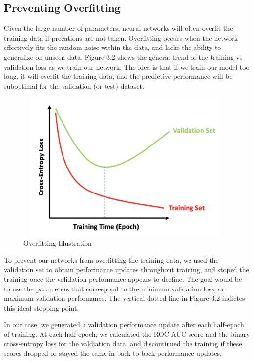 \documentclass [MAS] {uclathes}
\begin{document}
\subsection{Preventing Overfitting}

Given the large number of parameters, neural networks will often overfit the training data if precations are not taken. Overfitting occurs when the network effectively fits the random noise within the data, and lacks the ability to generalize on unseen data. Figure 3.2 shows the general trend of the training vs validation loss as we train our network. The idea is that if we train our model too long, it will overfit the training data, and the predictive performance will be suboptimal for the validation (or test) dataset. 

\begin{figure}[h]
\centering
\includegraphics[height = 75mm, width=110mm]{imgs/overfitting.png}
\caption{Overfitting Illustration}
\label{fig:ovfit}
\end{figure}

To prevent our networks from overfitting the training data, we used the validation set to obtain performance updates throughout training, and stoped the training once the validation performance appears to decline. The goal would be to use the parameters that correspond to the minimum validation loss, or maximum validation performance. The vertical dotted line in Figure 3.2 indictes this ideal stopping point. 

In our case, we generated a validation performance update after each half-epoch of training. At each half-epoch, we calculated the ROC-AUC score and the binary cross-entropy loss for the valdiation data, and discontinued the training if these scores dropped or stayed the same in back-to-back performance updates.
\end{document}
